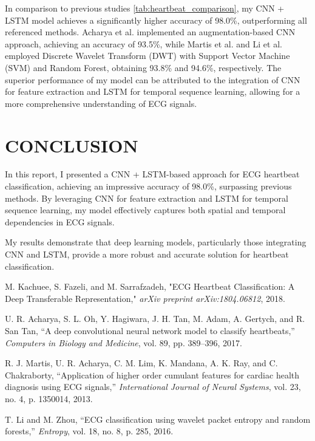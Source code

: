 \documentclass[10pt, conference]{IEEEtran}
\begin{document}
	In comparison to previous studies \ref{tab:heartbeat_comparison}, my CNN + LSTM model achieves a significantly higher accuracy of 98.0\%, outperforming all referenced methods. Acharya et al. \cite{acharya2017} implemented an augmentation-based CNN approach, achieving an accuracy of 93.5\%, while Martis et al. \cite{martis2013} and Li et al. \cite{li2016} employed Discrete Wavelet Transform (DWT) with Support Vector Machine (SVM) and Random Forest, obtaining 93.8\% and 94.6\%, respectively. The superior performance of my model can be attributed to the integration of CNN for feature extraction and LSTM for temporal sequence learning, allowing for a more comprehensive understanding of ECG signals.
	
	\section{\textbf{C}ONCLUSION}
	In this report, I presented a CNN + LSTM-based approach for ECG heartbeat classification, achieving an impressive accuracy of 98.0\%, surpassing previous methods. By leveraging CNN for feature extraction and LSTM for temporal sequence learning, my model effectively captures both spatial and temporal dependencies in ECG signals.
	
	My results demonstrate that deep learning models, particularly those integrating CNN and LSTM, provide a more robust and accurate solution for heartbeat classification.
	
	\begin{thebibliography}{4}
		M. Kachuee, S. Fazeli, and M. Sarrafzadeh, 
		"ECG Heartbeat Classification: A Deep Transferable Representation," 
		\textit{arXiv preprint arXiv:1804.06812}, 2018.
		
		U. R. Acharya, S. L. Oh, Y. Hagiwara, J. H. Tan, M. Adam, A. Gertych, and R. San Tan,  
		``A deep convolutional neural network model to classify heartbeats,''  
		\textit{Computers in Biology and Medicine}, vol. 89, pp. 389--396, 2017.
		
		R. J. Martis, U. R. Acharya, C. M. Lim, K. Mandana, A. K. Ray, and C. Chakraborty,  
		``Application of higher order cumulant features for cardiac health diagnosis using ECG signals,''  
		\textit{International Journal of Neural Systems}, vol. 23, no. 4, p. 1350014, 2013.
		
		T. Li and M. Zhou,  
		``ECG classification using wavelet packet entropy and random forests,''  
		\textit{Entropy}, vol. 18, no. 8, p. 285, 2016.
		
		
		
	\end{thebibliography}
	
	
	
\end{document}
